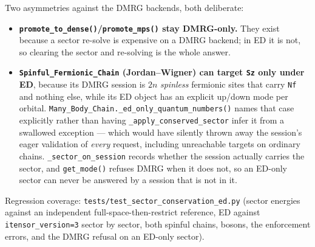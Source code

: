 \documentclass[11pt]{article}
\begin{document}
Two asymmetries against the DMRG backends, both deliberate:

\begin{itemize}
\item \textbf{\texttt{promote\_to\_dense()}/\texttt{promote\_mps()}
  stay DMRG-only.} They exist because a sector re-solve is expensive on a
  DMRG backend; in ED it is not, so clearing the sector and re-solving is
  the whole answer.
\item \textbf{\texttt{Spinful\_Fermionic\_Chain} (Jordan--Wigner) can
  target \texttt{Sz} only under ED}, because its DMRG session is $2n$
  \emph{spinless} fermionic sites that carry \texttt{Nf} and nothing
  else, while its ED object has an explicit up/down mode per orbital.
  \texttt{Many\_Body\_Chain.\_ed\_only\_quantum\_numbers()} names
  that case explicitly rather than having
  \texttt{\_apply\_conserved\_sector} infer it from a swallowed
  exception --- which would have silently thrown away the session's eager
  validation of \emph{every} request, including unreachable targets on
  ordinary chains. \texttt{\_sector\_on\_session} records whether the
  session actually carries the sector, and \texttt{get\_mode()} refuses
  DMRG when it does not, so an ED-only sector can never be answered by a
  session that is not in it.
\end{itemize}

Regression coverage: \texttt{tests/test\_sector\_conservation\_ed.py}
(sector energies against an independent full-space-then-restrict
reference, ED against \texttt{itensor\_version=3} sector by sector, both
spinful chains, bosons, the enforcement errors, and the DMRG refusal on an
ED-only sector).
\end{document}

